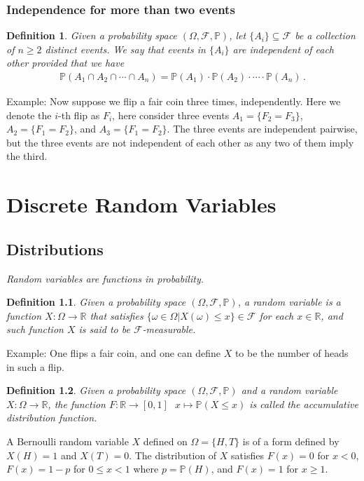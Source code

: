 \documentclass[11pt, onesided]{book}
\theoremstyle{break}
\theoremstyle{break}
\newtheorem{defn}{Definition}[thm]
\newcommand{\R}{\mathbb{R}}
\newcommand{\example}{\color{green}Example: \color{black}}
\begin{document}
\subsection{Independence for more than two events}
\begin{defn}
Given a probability space $(\Omega, \mathcal{F}, \mathbb{P})$, let $\{A_i\} \subseteq \mathcal{F}$ be a collection of $n\geq 2$ distinct events. We say that events in $\{A_i\}$ are independent of each other provided that we have
\begin{align*}
\mathbb{P}(A_1 \cap A_2 \cap \cdots \cap A_n) = \mathbb{P}(A_1) \cdot \mathbb{P}(A_2) \cdot \cdots \cdot \mathbb{P}(A_n)\,.
\end{align*}
\end{defn}
\example Now suppose we flip a fair coin three times, independently. Here we denote the $i$-th flip as $F_i$, here consider three events $A_1= \{F_2 = F_3\}$, $A_2 = \{F_1 = F_2\}$, and $A_3 = \{F_1 = F_2\}$. The three events are independent pairwise, but the three events are not independent of each other as any two of them imply the third. 

\chapter{Discrete Random Variables}
\setcounter{section}{3}
\section[Distributions]{\color{red}Distributions\color{black}}
\textit{Random variables are functions in probability.} 
\begin{defn} 
Given a probability space $(\Omega, \mathcal{F}, \mathbb{P})$, a random variable is a function $X: \Omega \to \R$ that satisfies $\{\omega \in \Omega | X(\omega) \leq x\} \in \mathcal{F}$ for each $x \in \R$, and such function $X$ is said to be $\mathcal{F}$-measurable. 
\end{defn}

\example One flips a fair coin, and one can define $X$ to be the number of heads in such a flip.

\begin{defn}
Given a probability space $(\Omega, \mathcal{F}, \mathbb{P})$ and a random variable $X: \Omega\to  \R$, the function $F: \R \to [0,1] \ \ \ x\mapsto \mathbb{P}(X\leq x)$ is called the accumulative distribution function.
\end{defn}

A Bernoulli random variable $X$ defined on $\Omega = \{H,T\}$ is of a form defined by $X(H) = 1$ and $X(T) = 0$. The distribution of $X$ satisfies $F(x) = 0$ for $x<0$, $F(x) = 1-p$ for $0\leq x< 1$ where $p = \mathbb{P}(H)$, and $F(x) = 1$ for $x \geq 1$.\\
\end{document}
